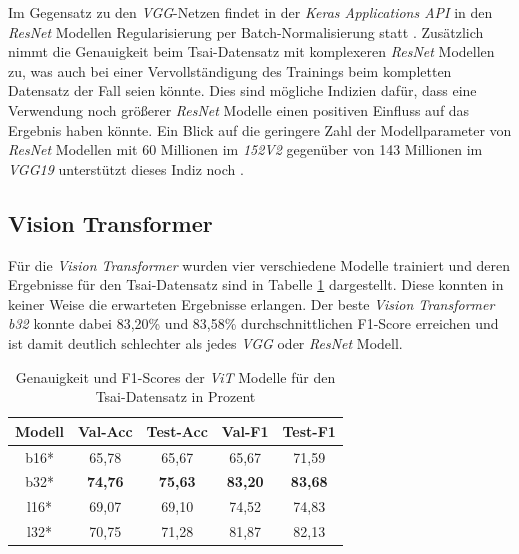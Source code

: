 \documentclass[twoside,a4paper]{IEEEtran}
\begin{document}
Im Gegensatz zu den \emph{VGG}-Netzen findet in der \emph{Keras Applications API} in den \emph{ResNet} Modellen Regularisierung per Batch-Normalisierung statt \cite{resnet_keras}. Zusätzlich nimmt die Genauigkeit beim Tsai-Datensatz mit komplexeren \emph{ResNet} Modellen zu, was auch bei einer Vervollständigung des Trainings beim kompletten Datensatz der Fall seien könnte. Dies sind mögliche Indizien dafür, dass eine Verwendung noch größerer \emph{ResNet} Modelle einen positiven Einfluss auf das Ergebnis haben könnte. Ein Blick auf die geringere Zahl der Modellparameter von \emph{ResNet} Modellen mit 60 Millionen im \emph{152V2} gegenüber von 143 Millionen im \emph{VGG19} unterstützt dieses Indiz noch \cite{keras_app}.
\subsection{Vision Transformer}
Für die \emph{Vision Transformer} wurden vier verschiedene Modelle trainiert und deren Ergebnisse für den Tsai-Datensatz sind in Tabelle \ref{vit_ergebnis_tsai} dargestellt. Diese konnten in keiner Weise die erwarteten Ergebnisse erlangen. Der beste \emph{Vision Transformer} \emph{b32} konnte dabei 83,20\% und 83,58\% durchschnittlichen F1-Score erreichen und ist damit deutlich schlechter als jedes \emph{VGG} oder \emph{ResNet} Modell.
\begin{table}[!htb]
	\caption{Genauigkeit und F1-Scores der \emph{ViT} Modelle für den Tsai-Datensatz in Prozent}
	\label{vit_ergebnis_tsai}
	\centering
	\begin{tabular}{|c|c|c|c|c|}
		\hline
		Modell & Val-Acc & Test-Acc & Val-F1 & Test-F1\\
		\hline
		\hline
		b16* & 65,78 & 65,67 & 65,67 & 71,59\\
		\hline
		b32* & \textbf{74,76} & \textbf{75,63} & \textbf{83,20} & \textbf{83,68}\\
		\hline
		l16* & 69,07 & 69,10 & 74,52 & 74,83\\
		\hline
		l32* & 70,75 & 71,28 & 81,87 & 82,13\\
		\hline 
	\end{tabular}
\end{table}
\end{document}
